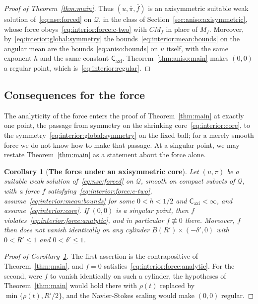 \documentclass[11pt,reqno]{amsproc}
\numberwithin{equation}{section}
\newtheorem{corollary}[theorem]{Corollary}
\theoremstyle{remark}
\newcommand{\Caxi}{\mathsf{C}_{\mathrm{axi}}}
\begin{document}
\begin{proof}[Proof of Theorem~\ref{thm:main}]
Thus $(u,\bar\pi,\bar f)$ is an axisymmetric suitable weak solution of~\eqref{eq:nse:forced} on $\mathcal Q$, in the class of Section~\ref{sec:aniso:axisymmetric}, whose force obeys~\eqref{eq:interior:force:c-two} with $CM_f$ in place of $M_f$. Moreover, by~\eqref{eq:interior:global:symmetry} the bounds~\eqref{eq:interior:mean:bounds} on the angular mean are the bounds~\eqref{eq:aniso:bounds} on $u$ itself, with the same exponent $h$ and the same constant $\Caxi$. Theorem~\ref{thm:aniso:main} makes $(0,0)$ a regular point, which is~\eqref{eq:interior:regular}.
\end{proof}

\subsection{Consequences for the force}
\label{sec:reduction:force}
The analyticity of the force enters the proof of Theorem~\ref{thm:main} at exactly one point, the passage from symmetry on the shrinking core~\eqref{eq:interior:core}, to the symmetry~\eqref{eq:interior:global:symmetry} on the fixed ball; for a merely smooth force we do not know how to make that passage. At a singular point, we may restate Theorem~\ref{thm:main} as a statement about the force alone.

\begin{corollary}[{\bf The force under an axisymmetric core}]
\label{cor:interior:nonanalytic}
Let $(u,\pi)$ be a suitable weak solution of~\eqref{eq:nse:forced} on $\mathcal Q$, smooth on compact subsets of $\mathcal Q$, with a force $f$ satisfying~\eqref{eq:interior:force:c-two},  assume~\eqref{eq:interior:mean:bounds} for some $0<h<1/2$  and $\Caxi<\infty$, and assume~\eqref{eq:interior:core}. If $(0,0)$ is a singular point, then $f$ violates~\eqref{eq:interior:force:analytic}, and in particular $f\not\equiv0$ there. Moreover, $f$ then does not vanish identically on any cylinder $B(R')\times(-\delta',0)$ with $0<R'\le1$ and $0<\delta'\le1$.
\end{corollary}

\begin{proof}[Proof of Corollary~\ref{cor:interior:nonanalytic}]
The first assertion is the contrapositive of Theorem~\ref{thm:main}, and $f=0$ satisfies~\eqref{eq:interior:force:analytic}. For the second, were $f$ to vanish identically on such a cylinder, the hypotheses of Theorem~\ref{thm:main} would hold there with $\rho(t)$ replaced by $\min\{\rho(t),R'/2\}$, and the Navier-Stokes scaling would make $(0,0)$ regular.
\end{proof}
\end{document}
